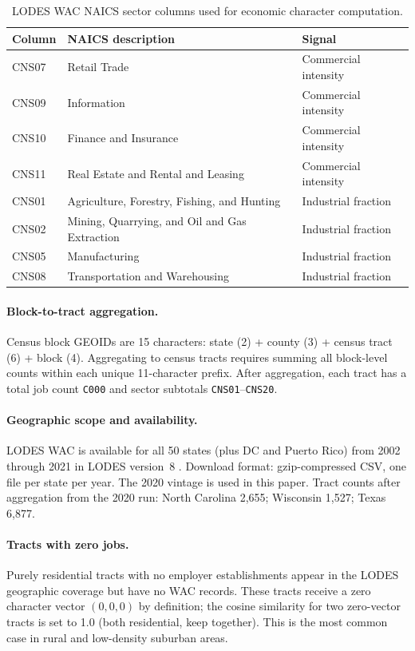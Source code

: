 \begin{table}[ht]
\centering
\caption{LODES WAC NAICS sector columns used for economic character computation.}
\label{tab:cns-sectors}
\small
\begin{tabular}{lll}
\toprule
Column & NAICS description & Signal \\
\midrule
CNS07 & Retail Trade & Commercial intensity \\
CNS09 & Information & Commercial intensity \\
CNS10 & Finance and Insurance & Commercial intensity \\
CNS11 & Real Estate and Rental and Leasing & Commercial intensity \\
\midrule
CNS01 & Agriculture, Forestry, Fishing, and Hunting & Industrial fraction \\
CNS02 & Mining, Quarrying, and Oil and Gas Extraction & Industrial fraction \\
CNS05 & Manufacturing & Industrial fraction \\
CNS08 & Transportation and Warehousing & Industrial fraction \\
\bottomrule
\end{tabular}
\end{table}

\paragraph{Block-to-tract aggregation.}
Census block GEOIDs are 15 characters: state (2) + county (3) + census tract
(6) + block (4).
Aggregating to census tracts requires summing all block-level counts within
each unique 11-character prefix.
After aggregation, each tract has a total job count \texttt{C000} and sector
subtotals \texttt{CNS01}--\texttt{CNS20}.

\paragraph{Geographic scope and availability.}
LODES WAC is available for all 50 states (plus DC and Puerto Rico) from 2002
through 2021 in LODES version~8 \citep{lodes2022}.
Download format: gzip-compressed CSV, one file per state per year.
The 2020 vintage is used in this paper.
Tract counts after aggregation from the 2020 run:
North Carolina 2,655; Wisconsin 1,527; Texas 6,877.

\paragraph{Tracts with zero jobs.}
Purely residential tracts with no employer establishments appear in the
LODES geographic coverage but have no WAC records.
These tracts receive a zero character vector $(0, 0, 0)$ by definition;
the cosine similarity for two zero-vector tracts is set to 1.0
(both residential, keep together).
This is the most common case in rural and low-density suburban areas.

